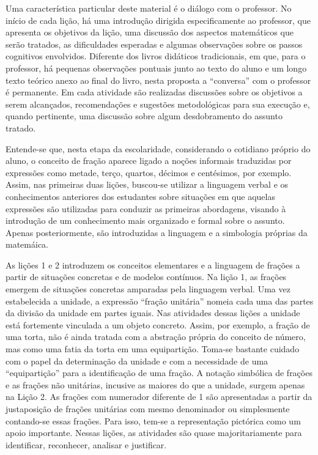 Uma característica particular deste material é o diálogo com o professor. No início de cada lição, há uma introdução dirigida especificamente ao professor, que apresenta os objetivos da lição, uma discussão dos aspectos matemáticos que serão tratados, as dificuldades esperadas e algumas observações sobre os passos cognitivos envolvidos. Diferente dos livros didáticos tradicionais, em que, para o professor, há pequenas observações pontuais junto ao texto do aluno e um longo texto teórico anexo ao final do livro, nesta proposta a ``conversa'' com o professor é permanente. Em cada atividade são realizadas discussões sobre os objetivos a serem alcançados, recomendações e sugestões metodológicas para sua execução e, quando pertinente, uma discussão sobre algum desdobramento do assunto tratado.


Entende-se que, nesta etapa da escolaridade, considerando o cotidiano próprio do aluno, o conceito de fração aparece ligado a  noções informais traduzidas por expressões como metade, terço, quartos, décimos e centésimos, por exemplo. Assim, nas primeiras duas lições, buscou-se utilizar a linguagem verbal e os conhecimentos anteriores dos estudantes sobre situações em que aquelas expressões são utilizadas para conduzir as primeiras abordagens, visando à introdução de um conhecimento mais organizado e formal sobre o assunto. Apenas posteriormente, são introduzidas a linguagem e a simbologia próprias da matemáica. 

As lições 1 e 2 introduzem os conceitos elementares e a linguagem de frações a partir de situações concretas e de modelos contínuos. Na lição 1, as frações emergem de situações concretas amparadas pela linguagem verbal. Uma vez estabelecida a unidade, a expressão ``fração unitária'' nomeia cada uma das partes da divisão da unidade em partes iguais. Nas atividades dessas lições a unidade está fortemente vinculada a um objeto concreto. Assim, por exemplo, a fração de uma torta, não é ainda tratada com a abstração própria do conceito de número, mas como uma fatia da torta em uma equipartição. Toma-se bastante cuidado com o papel da determinação da unidade e com a necessidade de uma ``equipartição'' para a identificação de uma fração. A notação simbólica de frações e as frações não unitárias, incusive as maiores do que a unidade, surgem apenas na Lição 2. As frações com numerador diferente de 1 são apresentadas a partir da justaposição de frações unitárias com mesmo denominador ou simplesmente contando-se essas frações. Para isso, tem-se a representação pictórica como um apoio importante. Nessas lições, as atividades são quase majoritariamente para identificar, reconhecer, analisar e justificar. 

